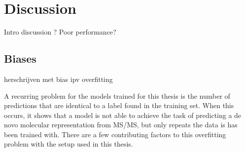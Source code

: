 \chapter{Discussion}
\label{chap:discussion}

Intro discussion ? Poor performance?

\section{Biases}
\label{sec:overfitting}
 
herschrijven met bias ipv overfitting

A recurring problem for the models trained for this thesis is the number of predictions that are identical to a label found in the training set.
When this occurs, it shows that a model is not able to achieve the task of predicting a de novo molecular representation from \ac{MS/MS}, but only repeats the data is has been trained with.
There are a few contributing factors to this overfitting problem with the setup used in this thesis.

